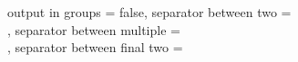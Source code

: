 
\makeatletter
\let\thetitle\@title
\let\theauthor\@author
\makeatother

\SetupAffiliations
  {
    output in groups = false,
    separator between two = {\bigskip\\},
    separator between multiple = {\bigskip\\},
    separator between final two = {\bigskip\\}
  }


\newcommand{\bookorchapter}[2]{\ifbool{bookcompile}{#1}{#2}}

\providecommand{\gl}{}
